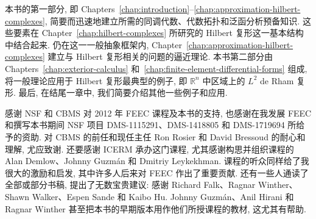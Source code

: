 本书的第一部分, 即 Chapters~\ref{chap:introduction}--\ref{chap:approximation-hilbert-complexes}, 简要而迅速地建立所需的同调代数、代数拓扑和泛函分析预备知识. 这些要素在 Chapter~\ref{chap:hilbert-complexes} 所研究的 Hilbert 复形这一基本结构中结合起来. 仍在这一一般抽象框架内, Chapter~\ref{chap:approximation-hilbert-complexes} 建立与 Hilbert 复形相关的问题的逼近理论. 本书第二部分由 Chapters~\ref{chap:exterior-calculus} 和~\ref{chap:finite-element-differential-forms} 组成, 将一般理论应用于 Hilbert 复形最典型的例子, 即 $\mathbb R^n$ 中区域上的 $L^2$ de Rham 复形. 最后, 在结尾一章中, 我们简要介绍其他一些例子和应用.

感谢 NSF 和 CBMS 对 2012 年 FEEC 课程及本书的支持, 也感谢在我发展 FEEC 和撰写本书期间 NSF 项目 DMS-1115291、DMS-1418805 和 DMS-1719694 所给予的资助. 对 CBMS 的前任和现任主任 Ron Rosier 和 David Bressoud 的耐心和理解, 尤应致谢. 还要感谢 ICERM 承办这门课程, 尤其感谢构思并组织课程的 Alan Demlow、Johnny Guzmán 和 Dmitriy Leykekhman. 课程的听众同样给了我很大的激励和启发, 其中许多人后来对 FEEC 作出了重要贡献. 还有一些人通读了全部或部分书稿, 提出了无数宝贵建议: 感谢 Richard Falk、Ragnar Winther、Shawn Walker、Espen Sande 和 Kaibo Hu. Johnny Guzmán、Anil Hirani 和 Ragnar Winther 甚至把本书的早期版本用作他们所授课程的教材, 这尤其有帮助.

